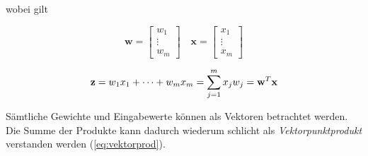 wobei gilt 

\begin{equation} \label{eq:vektorprod}
\mathbf{w} = \begin{bmatrix}
    w_{1}  \\
    \vdots \\
    w_{m}
\end{bmatrix}
\quad  \mathbf{x} = \begin{bmatrix}
    x_{1}  \\
    \vdots \\
    x_{m}
\end{bmatrix}
\end{equation}

\begin{equation}
\mathbf{z} =  w_1x_{1} + \dots + w_mx_{m} = \sum_{j=1}^{m} x_{j}w_{j} \\ = \mathbf{w}^T\mathbf{x}
\end{equation}

Sämtliche Gewichte und Eingabewerte können als Vektoren betrachtet werden. Die Summe der Produkte kann dadurch wiederum schlicht als \emph{Vektorpunktprodukt} verstanden werden (\ref{eq:vektorprod}).
